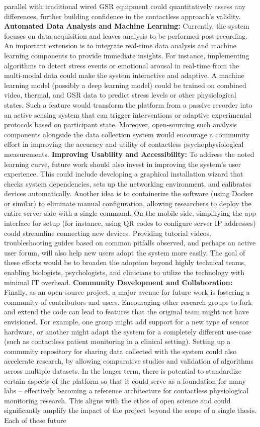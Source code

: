 \documentclass[11pt,a4paper]{report}
\begin{document}
{parallel with traditional wired GSR equipment could quantitatively assess any differences, further building confidence in the contactless approach’s validity. \textbf{Automated Data Analysis and Machine Learning:} Currently, the system focuses on data acquisition and leaves analysis to be performed post-recording. An important extension is to integrate real-time data analysis and machine learning components to provide immediate insights. For instance, implementing algorithms to detect stress events or emotional arousal in real-time from the multi-modal data could make the system interactive and adaptive. A machine learning model (possibly a deep learning model) could be trained on combined video, thermal, and GSR data to predict stress levels or other physiological states. Such a feature would transform the platform from a passive recorder into an active sensing system that can trigger interventions or adaptive experimental protocols based on participant state. Moreover, open-sourcing such analysis components alongside the data collection system would encourage a community effort in improving the accuracy and utility of contactless psychophysiological measurements. \textbf{Improving Usability and Accessibility:} To address the noted learning curve, future work should also invest in improving the system’s user experience. This could include developing a graphical installation wizard that checks system dependencies, sets up the networking environment, and calibrates devices automatically. Another idea is to containerize the software (using Docker or similar) to eliminate manual configuration, allowing researchers to deploy the entire server side with a single command. On the mobile side, simplifying the app interface for setup (for instance, using QR codes to configure server IP addresses) could streamline connecting new devices. Providing tutorial videos, troubleshooting guides based on common pitfalls observed, and perhaps an active user forum, will also help new users adopt the system more easily. The goal of these efforts would be to broaden the adoption beyond highly technical teams, enabling biologists, psychologists, and clinicians to utilize the technology with minimal IT overhead. \textbf{Community Development and Collaboration:} Finally, as an open-source project, a major avenue for future work is fostering a community of contributors and users. Encouraging other research groups to fork and extend the code can lead to features that the original team might not have envisioned. For example, one group might add support for a new type of sensor hardware, or another might adapt the system for a completely different use-case (such as contactless patient monitoring in a clinical setting). Setting up a community repository for sharing data collected with the system could also accelerate research, by allowing comparative studies and validation of algorithms across multiple datasets. In the longer term, there is potential to standardize certain aspects of the platform so that it could serve as a foundation for many labs – effectively becoming a reference architecture for contactless physiological monitoring research. This aligns with the ethos of open science and could significantly amplify the impact of the project beyond the scope of a single thesis. Each of these future }
\end{document}
